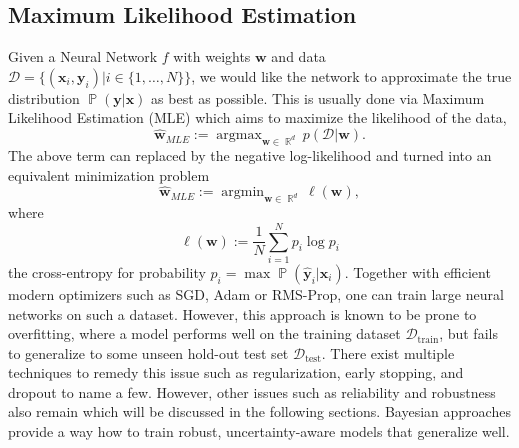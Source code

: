 \documentclass[a4paper, 11pt, oneside]{scrartcl}
\theoremstyle{break}
\DeclareMathOperator*{\argmin}{argmin}
\DeclareMathOperator*{\argmax}{argmax}
\DeclareMathOperator{\Real}{\mathbb{R}}
\DeclareMathOperator{\Prob}{\mathbb{P}}
\newcommand{\matr}[1]{\boldsymbol{#1}}
\newcommand{\set}[1]{\mathcal{#1}}
\numberwithin{equation}{section}
\begin{document}
		\subsection{Maximum Likelihood Estimation}
			Given a Neural Network $f$ with weights $\matr{w}$ and data $\set{D} = \{(\matr{x}_i, \matr{y}_i) | i \in \{1, \dots, N\}\}$, we would like the network to approximate the true distribution $\Prob(\matr{y} | \matr{x})$ as best as possible. 
			This is usually done via Maximum Likelihood Estimation (MLE) which aims to maximize the likelihood of the data,
			\begin{equation}
				\matr{\hat{w}}_{MLE} := \argmax_{\matr{w} \in \Real^d} p(\set{D} | \matr{w}).
				\label{eqn:MLE}
			\end{equation}
			The above term can replaced by the negative log-likelihood and turned into an equivalent minimization problem
			\begin{equation}
				\matr{\hat{w}}_{MLE} := \argmin_{\matr{w} \in \Real^d} \ell(\matr{w}),
				\label{eqn:MLE_NLL}
			\end{equation}
			where 
			\begin{equation}
				\ell(\matr{w}) := \frac{1}{N} \sum_{i=1}^N p_i \log p_i
				\label{eqn:NLL}
			\end{equation}
			the cross-entropy for probability $p_i = \max \Prob (\matr{\hat{y}}_i | \matr{x}_i )$. 
			Together with efficient modern optimizers such as SGD, Adam or RMS-Prop, one can train large neural networks on such a dataset. 
			However, this approach is known to be prone to overfitting, where a model performs well on the training dataset $\set{D}_{\text{train}}$, but fails to generalize to some unseen hold-out test set $\set{D}_{\text{test}}$. 
			There exist multiple techniques to remedy this issue such as regularization, early stopping, and dropout to name a few.
			However, other issues such as reliability and robustness also remain which will be discussed in the following sections. 
			Bayesian approaches provide a way how to train robust, uncertainty-aware models that generalize well. 
\end{document}

